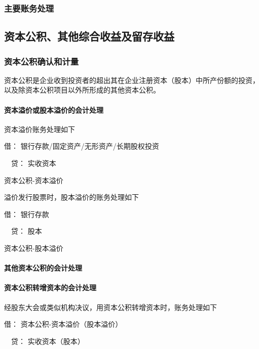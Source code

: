 \documentclass[UTF8,12pt]{ctexart}
\newenvironment{Dr}{\noindent 借：}{\par}
\newenvironment{Cr}{\noindent \ \ 贷：}{\par}
\numberwithin{equation}{section} %
\numberwithin{figure}{section}
\numberwithin{table}{section}
\begin{document}
	\subsubsection{主要账务处理}
	
	\subsection{资本公积、其他综合收益及留存收益}
	
	\subsubsection{资本公积确认和计量}
	资本公积是企业收到投资者的超出其在企业注册资本（股本）中所产份额的投资，以及除资本公积项目以外所形成的其他资本公积。
	
	\paragraph{资本溢价或股本溢价的会计处理}
	资本溢价账务处理如下
	
	\begin{Dr}
		银行存款/固定资产/无形资产/长期股权投资
	\end{Dr}
	\begin{Cr}
		实收资本
		
		资本公积-资本溢价
	\end{Cr}
	
	溢价发行股票时，股本溢价的账务处理如下
	
	\begin{Dr}
		银行存款
	\end{Dr}
	\begin{Cr}
		股本
		
		资本公积-股本溢价
	\end{Cr}
	
	\paragraph{其他资本公积的会计处理}
	
	\paragraph{资本公积转增资本的会计处理}
	
	经股东大会或类似机构决议，用资本公积转增资本时，账务处理如下
	
	\begin{Dr}
		资本公积-资本溢价（股本溢价）
	\end{Dr}
	\begin{Cr}
		实收资本（股本）
	\end{Cr}
	
\end{document}
